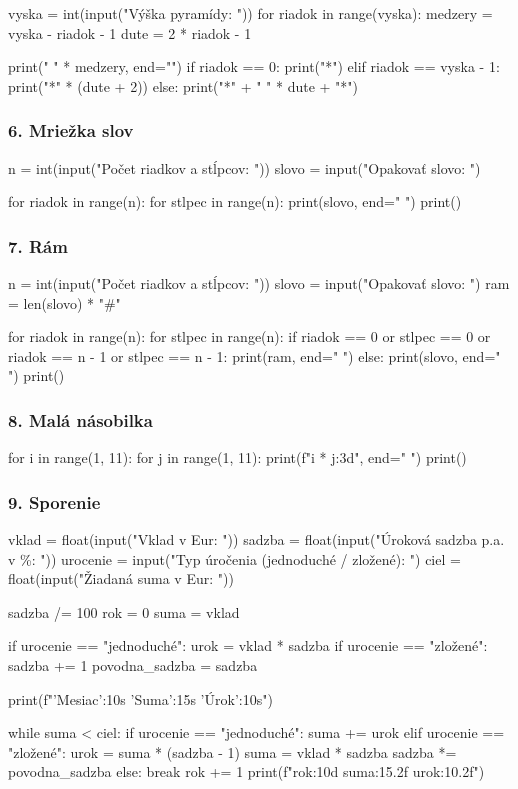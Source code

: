 \begin{solution}
vyska = int(input("Výška pyramídy: "))
for riadok in range(vyska):
    medzery = vyska - riadok - 1
    dute = 2 * riadok - 1

    print(" " * medzery, end="")
    if riadok == 0:
        print("*")
    elif riadok == vyska - 1:
        print("*" * (dute + 2))
    else:
        print("*" + " " * dute + "*")
\end{solution}

\subsubsection*{6. Mriežka slov}
\begin{solution}
n = int(input("Počet riadkov a stĺpcov: "))
slovo = input("Opakovať slovo: ")

for riadok in range(n):
    for stlpec in range(n):
        print(slovo, end=" ")
    print()
\end{solution}

\subsubsection*{7. Rám}
\begin{solution}
n = int(input("Počet riadkov a stĺpcov: "))
slovo = input("Opakovať slovo: ")
ram = len(slovo) * "#"

for riadok in range(n):
    for stlpec in range(n):
        if riadok == 0 or stlpec == 0 or riadok == n - 1 or stlpec == n - 1:
            print(ram, end=" ")
        else:
            print(slovo, end=" ")
    print()
\end{solution}

\subsubsection*{8. Malá násobilka}
\begin{solution}
for i in range(1, 11):
    for j in range(1, 11):
        print(f"{i * j:3d}", end=" ")
    print()
\end{solution}

\subsubsection*{9. Sporenie}
\begin{solution}
vklad = float(input("Vklad v Eur: "))
sadzba = float(input("Úroková sadzba p.a. v \%: "))
urocenie = input("Typ úročenia (jednoduché / zložené): ")
ciel = float(input("Žiadaná suma v Eur: "))

sadzba /= 100
rok = 0
suma = vklad

if urocenie == "jednoduché":
    urok = vklad * sadzba
if urocenie == "zložené":
    sadzba += 1
    povodna_sadzba = sadzba

print(f"{'Mesiac':10s} {'Suma':15s} {'Úrok':10s}")

while suma < ciel:
    if urocenie == "jednoduché":
        suma += urok
    elif urocenie == "zložené":
        urok = suma * (sadzba - 1)
        suma = vklad * sadzba
        sadzba *= povodna_sadzba
    else:
        break
    rok += 1
    print(f"{rok:10d} {suma:15.2f} {urok:10.2f}")
\end{solution}
